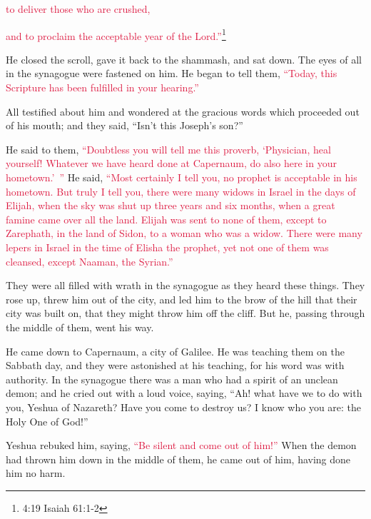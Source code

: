 \textcolor{crimson}{to deliver those who are crushed,}

\myverse{}\textcolor{crimson}{and to proclaim the acceptable year of the Lord.”}\footnote{ 4:19 Isaiah 61:1-2}

\myverse{}He closed the scroll, gave it back to the shammash, and sat down.
The eyes of all in the synagogue were fastened on him.
\myverse{}He began to tell them,
\textcolor{crimson}{“Today, this Scripture has been fulfilled in your hearing.”}

\myverse{}All testified about him and wondered at the gracious words which
proceeded out of his mouth; and they said, “Isn’t this Joseph’s son?”

\myverse{}He said to them,
\textcolor{crimson}{“Doubtless you will tell me this proverb, ‘Physician, heal yourself! Whatever we have heard done at
	Capernaum, do also here in your hometown.’ ”}
\myverse{}He said,
\textcolor{crimson}{“Most certainly I tell you, no prophet is acceptable in his hometown.
}
\myverse{}\textcolor{crimson}{But truly I tell you, there were many widows in Israel in the days of
	Elijah, when the sky was shut up three years and six months, when a great famine came over all the land.
}
\myverse{}\textcolor{crimson}{Elijah was sent to none of them, except to Zarephath, in the land of Sidon,
	to a woman who was a widow.
}
\myverse{}\textcolor{crimson}{There were many lepers in Israel in the time of Elisha the prophet, yet
	not one of them was cleansed, except Naaman, the Syrian.”}

\myverse{}They were all filled with wrath in the synagogue as they heard
these things.
\myverse{}They rose up, threw him out of the city, and led him to the brow of the hill
that their city was built on, that they might throw him off the cliff.
\myverse{}But he, passing through the middle of them, went his way.

\myverse{}He came down to Capernaum, a city of Galilee. He was teaching
them on the Sabbath day,
\myverse{}and they were astonished at his teaching, for his word was with authority.
\myverse{}In the synagogue there was a man who had a spirit of an unclean demon; and
he cried out with a loud voice,
\myverse{}saying, “Ah! what have we to do with you, Yeshua of Nazareth? Have you come
to destroy us? I know who you are: the Holy One of God!”

\myverse{}Yeshua rebuked him, saying,
\textcolor{crimson}{“Be silent and come out of him!”
} When the demon had thrown him down in the middle of them, he came out of him, having done him no
harm.

